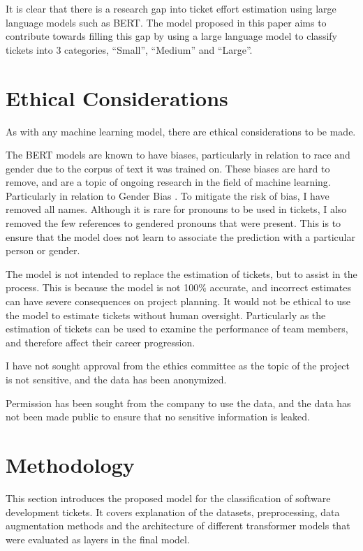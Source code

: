 \documentclass{UoYCSproject}
\begin{document}
    It is clear that there is a research gap into ticket effort estimation using large language models such as BERT.
    The model proposed in this paper aims to contribute towards filling this gap by using a large language model to classify tickets into 3 categories, “Small”, “Medium” and “Large”.

    \chapter{Ethical Considerations}
    As with any machine learning model, there are ethical considerations to be made.

    The BERT models are known to have biases, particularly in relation to race and gender due to the corpus of text it was trained on.
    These biases are hard to remove, and are a topic of ongoing research in the field of machine learning. Particularly in relation to Gender Bias \cite{Jentzsch_2022, li2021detecting}.
    To mitigate the risk of bias, I have removed all names. Although it is rare for pronouns to be used in tickets, I also removed the few references to gendered pronouns that were present.
    This is to ensure that the model does not learn to associate the prediction with a particular person or gender.

    The model is not intended to replace the estimation of tickets, but to assist in the process. This is because the model is not 100\% accurate, and incorrect estimates can have severe consequences on project planning.
    It would not be ethical to use the model to estimate tickets without human oversight. Particularly as the estimation of tickets can be used to examine the performance of team members, and therefore affect their career progression.

    I have not sought approval from the ethics committee as the topic of the project is not sensitive, and the data has been anonymized.

    Permission has been sought from the company to use the data, and the data has not been made public to ensure that no sensitive information is leaked.


    \chapter{Methodology}
    \label{ch:methodology}
    This section introduces the proposed model for the classification of software development tickets.
    It covers explanation of the datasets, preprocessing, data augmentation methods and the architecture of different transformer models that were evaluated as layers in the final model.
\end{document}
